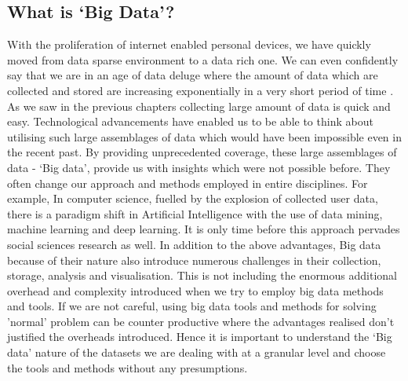 
\subsection{What is `Big Data'?}

With the proliferation of internet enabled personal devices, we have quickly moved from data sparse environment to a data rich one.
We can even confidently say that we are in an age of data deluge where the amount of data which are collected and stored are increasing exponentially in a very short period of time \cite{kitchin2014big}.
As we saw in the previous chapters collecting large amount of data is quick and easy.
Technological advancements have enabled us to be able to think about utilising such large assemblages of data which would have been impossible even in the recent past.
By providing unprecedented coverage, these large assemblages of data - `Big data', provide us with insights which were not possible before.
They often change our approach and methods employed in entire disciplines.
For example, In computer science, fuelled by the explosion of collected user data, there is a paradigm shift in Artificial Intelligence with the use of data mining, machine learning and deep learning.
It is only time before this approach pervades social sciences research as well.
In addition to the above advantages, Big data because of their nature also introduce numerous challenges in their collection, storage, analysis and visualisation.
This is not including the enormous additional overhead and complexity introduced when we try to employ big data methods and tools.
If we are not careful, using big data tools and methods for solving 'normal' problem can be counter productive where the advantages realised don't justified the overheads introduced.
Hence it is important to understand the `Big data' nature of the datasets we are dealing with at a granular level and choose the tools and methods without any presumptions.



